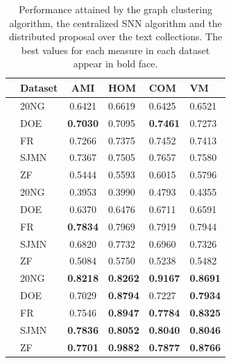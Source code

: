 \documentclass[a4paper]{article}
\begin{document}
\begin{table}[!htbp]
\centering
\begin{tabular}{cl|clll}
&\textbf{Dataset} & \textbf{AMI}  & \textbf{HOM} & \textbf{COM} & \textbf{VM} \\ \hline
\parbox[t]{2mm}{}&20NG   &  0.6421          &  0.6619          &  0.6425          & 0.6521  \\
&DOE    &  \textbf{0.7030} &  0.7095          &  \textbf{0.7461} & 0.7273  \\
&FR     &  0.7266          &  0.7375          &  0.7452          & 0.7413  \\
&SJMN   &  0.7367          &  0.7505          &  0.7657          & 0.7580  \\
&ZF     &  0.5444          &  0.5593          &  0.6015          & 0.5796  \\ \hline
\parbox[t]{2mm}{} &20NG   &  0.3953          &  0.3990          &  0.4793          & 0.4355\\
&DOE    &  0.6370          &  0.6476          &  0.6711          & 0.6591\\
&FR     &  \textbf{0.7834} &  0.7969          &  0.7919          & 0.7944\\
&SJMN   &  0.6820          &  0.7732          &  0.6960          & 0.7326\\
&ZF     & 0.5084           &  0.5750          &  0.5238          & 0.5482\\ \hline
\parbox[t]{2mm}{} &20NG   & \textbf{0.8218}  &  \textbf{0.8262} & \textbf{0.9167}  & \textbf{0.8691}  \\
&DOE    & 0.7029           &  \textbf{0.8794} & 0.7227           & \textbf{0.7934}  \\
&FR     & 0.7546           &  \textbf{0.8947} & \textbf{0.7784}  & \textbf{0.8325}  \\
&SJMN   & \textbf{0.7836}  &  \textbf{0.8052} & \textbf{0.8040}  & \textbf{0.8046}  \\
&ZF     & \textbf{0.7701}  &  \textbf{0.9882} & \textbf{0.7877}  & \textbf{0.8766}  \\ \hline
\end{tabular}
\caption{Performance attained by the graph clustering algorithm, the centralized SNN algorithm and the  distributed proposal  over the text collections. The best values for each measure in each dataset appear in bold face.}
\label{table:results}
\end{table}
\end{document}
